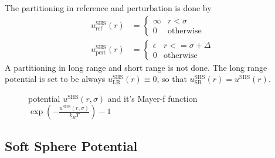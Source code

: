 The partitioning in reference and perturbation is done by
\begin{align}
u^\text{SHS}_\text{ref}(r) &=
\begin{cases}
\infty & r < \sigma \\
0        & \mbox{otherwise}
\end{cases}
\\
u^\text{SHS}_\text{pert}(r) &=
\begin{cases}
\epsilon  & r <= \sigma +\Delta\\
0         & \mbox{otherwise}
\end{cases}
\end{align}
A partitioning in long range and short range is not done. The long range potential
is set to be always $u^\text{SHS}_\text{LR}(r) \equiv 0$, so that
$u^\text{SHS}_\text{SR}(r)= u^\text{SHS}(r)$.

\begin{figure}[htb]
\centering
\captionsetup[subfigure]{position=b}
\centering
{}
\hfill
{}
\caption{potential $u^\text{SHS}(r,\sigma)$ and it's Mayer-f function $\exp\left(-\frac{u^\text{SHS}(r,\sigma)}{k_BT}\right)-1$}
\end{figure}

\clearpage
\subsection{Soft Sphere Potential}
~\\

